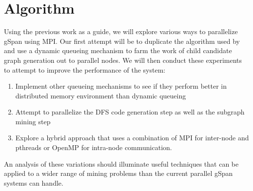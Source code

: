 \section{Algorithm}

Using the previous work as a guide, we will explore various ways to 
parallelize gSpan\cite{gspan} using MPI.  Our first attempt will be to 
duplicate the algorithm used by \cite{buehrer2005parallel} and use
a dynamic queueing mechanism to farm the work of child candidate 
graph generation out to parallel nodes.  We will then conduct these 
experiments to attempt to improve the performance of the system:

\begin{enumerate}
	\item{Implement other queueing mechanisms to see if they perform
		better in distributed memory environment than dynamic
		queueing}
	\item{Attempt to parallelize the DFS code generation step as well
		as the subgraph mining step}
	\item{Explore a hybrid approach that uses a combination of 
		MPI for inter-node and pthreads or OpenMP for intra-node
		communication.}
\end{enumerate}

An analysis of these variations should illuminate useful techniques that
can be applied to a wider range of mining problems than the current
parallel gSpan systems can handle.


